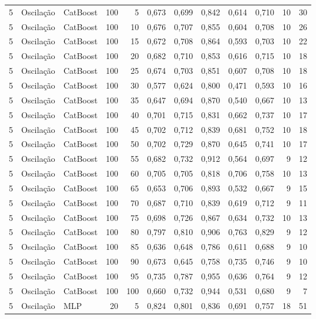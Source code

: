 \begin{longtable}{@{}rllrrrrrrrrr@{}}
5 & Oscilação & CatBoost & 100 & 5 & 0,673 & 0,699 & 0,842 & 0,614 & 0,710 & 10 & 30 \\
5 & Oscilação & CatBoost & 100 & 10 & 0,676 & 0,707 & 0,855 & 0,604 & 0,708 & 10 & 26 \\
5 & Oscilação & CatBoost & 100 & 15 & 0,672 & 0,708 & 0,864 & 0,593 & 0,703 & 10 & 22 \\
5 & Oscilação & CatBoost & 100 & 20 & 0,682 & 0,710 & 0,853 & 0,616 & 0,715 & 10 & 18 \\
5 & Oscilação & CatBoost & 100 & 25 & 0,674 & 0,703 & 0,851 & 0,607 & 0,708 & 10 & 18 \\
5 & Oscilação & CatBoost & 100 & 30 & 0,577 & 0,624 & 0,800 & 0,471 & 0,593 & 10 & 16 \\
5 & Oscilação & CatBoost & 100 & 35 & 0,647 & 0,694 & 0,870 & 0,540 & 0,667 & 10 & 13 \\
5 & Oscilação & CatBoost & 100 & 40 & 0,701 & 0,715 & 0,831 & 0,662 & 0,737 & 10 & 17 \\
5 & Oscilação & CatBoost & 100 & 45 & 0,702 & 0,712 & 0,839 & 0,681 & 0,752 & 10 & 18 \\
5 & Oscilação & CatBoost & 100 & 50 & 0,702 & 0,729 & 0,870 & 0,645 & 0,741 & 10 & 17 \\
5 & Oscilação & CatBoost & 100 & 55 & 0,682 & 0,732 & 0,912 & 0,564 & 0,697 & 9 & 12 \\
5 & Oscilação & CatBoost & 100 & 60 & 0,705 & 0,705 & 0,818 & 0,706 & 0,758 & 10 & 13 \\
5 & Oscilação & CatBoost & 100 & 65 & 0,653 & 0,706 & 0,893 & 0,532 & 0,667 & 9 & 15 \\
5 & Oscilação & CatBoost & 100 & 70 & 0,687 & 0,710 & 0,839 & 0,619 & 0,712 & 9 & 11 \\
5 & Oscilação & CatBoost & 100 & 75 & 0,698 & 0,726 & 0,867 & 0,634 & 0,732 & 10 & 13 \\
5 & Oscilação & CatBoost & 100 & 80 & 0,797 & 0,810 & 0,906 & 0,763 & 0,829 & 9 & 12 \\
5 & Oscilação & CatBoost & 100 & 85 & 0,636 & 0,648 & 0,786 & 0,611 & 0,688 & 9 & 10 \\
5 & Oscilação & CatBoost & 100 & 90 & 0,673 & 0,645 & 0,758 & 0,735 & 0,746 & 9 & 10 \\
5 & Oscilação & CatBoost & 100 & 95 & 0,735 & 0,787 & 0,955 & 0,636 & 0,764 & 9 & 12 \\
5 & Oscilação & CatBoost & 100 & 100 & 0,660 & 0,732 & 0,944 & 0,531 & 0,680 & 9 & 7 \\
5 & Oscilação & MLP & 20 & 5 & 0,824 & 0,801 & 0,836 & 0,691 & 0,757 & 18 & 51 \\

\end{longtable}

